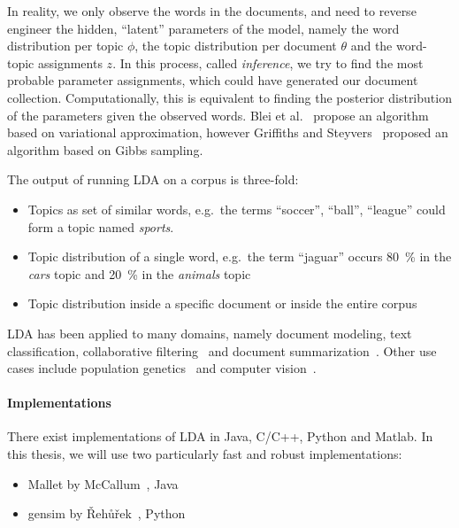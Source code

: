 \documentclass[
        a4paper,
        titlepage,
        twoside,
        parskip
        ]{scrbook}
\theoremstyle{break}
\begin{document}
In reality, we only observe the words in the documents, and need to reverse engineer the hidden, ``latent'' parameters of the model, namely the word distribution per topic $\phi$, the topic distribution per document $\theta$ and the word-topic assignments $z$.
In this process, called \emph{inference}, we try to find the most probable parameter assignments, which could have generated our document collection.
Computationally, this is equivalent to finding the posterior distribution of the parameters given the observed words.
Blei et al.~\cite{Blei2003} propose an algorithm based on variational approximation, however Griffiths and Steyvers~\cite{Griffiths2004} proposed an algorithm based on Gibbs sampling. %

The output of running LDA on a corpus is three-fold:
\begin{itemize}
       \item Topics as set of similar words, e.g.\ the terms ``soccer'', ``ball'', ``league'' could form a topic named \emph{sports}.
       \item Topic distribution of a single word, e.g.\ the term ``jaguar'' occurs 80~\% in the \emph{cars} topic and 20~\% in the \emph{animals} topic
       \item Topic distribution inside a specific document or inside the entire corpus
\end{itemize}

LDA has been applied to many domains, namely document modeling, text classification, collaborative filtering~\cite{Blei2003} and document summarization~\cite{Wang2009}.
Other use cases include population genetics~\cite{Pritchard2000} and computer vision~\cite{LiFei-Fei2005}.

\paragraph{Implementations}
There exist implementations of LDA in Java, C/C++, Python and Matlab.
In this thesis, we will use two particularly fast and robust implementations:
\begin{itemize}
       \item Mallet by McCallum~\cite{McCallum2002}, Java
       \item gensim by {\v R}eh{\r u}{\v r}ek~\cite{Rehurek2010}, Python
\end{itemize}

\end{document}
